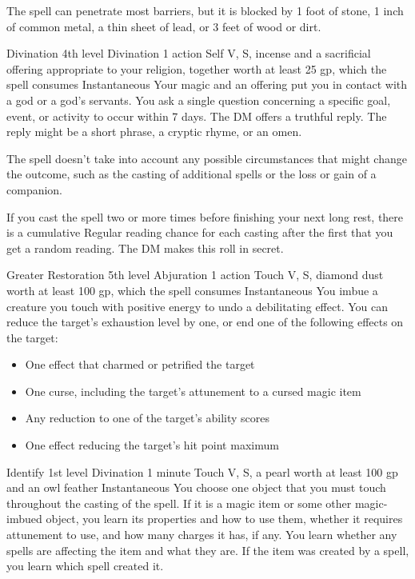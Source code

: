 \documentclass[10pt,a4paper,twoside,bg=print,twocolumn,openany,nodeprecatedcode]{dndbook}
\begin{document}
The spell can penetrate most barriers, but it is blocked by 1 foot of stone, 1 inch of common metal, a thin sheet of lead, or 3 feet of wood or dirt.



\DndSpellHeader%
{Divination}
{4th level Divination}
{1 action}
{Self}
{V, S, incense and a sacrificial offering appropriate to your religion, together worth at least 25 gp, which the spell consumes}
{Instantaneous}
Your magic and an offering put you in contact with a god or a god's servants. You ask a single question concerning a specific goal, event, or activity to occur within 7 days. The DM offers a truthful reply. The reply might be a short phrase, a cryptic rhyme, or an omen.

The spell doesn't take into account any possible circumstances that might change the outcome, such as the casting of additional spells or the loss or gain of a companion.

If you cast the spell two or more times before finishing your next long rest, there is a cumulative Regular reading chance for each casting after the first that you get a random reading. The DM makes this roll in secret.



\DndSpellHeader%
{Greater Restoration}
{5th level Abjuration}
{1 action}
{Touch}
{V, S, diamond dust worth at least 100 gp, which the spell consumes}
{Instantaneous}
You imbue a creature you touch with positive energy to undo a debilitating effect. You can reduce the target's exhaustion level by one, or end one of the following effects on the target:


\begin{itemize}
\item One effect that charmed or petrified the target
\item One curse, including the target's attunement to a cursed magic item
\item Any reduction to one of the target's ability scores
\item One effect reducing the target's hit point maximum
\end{itemize}



\DndSpellHeader%
{Identify}
{1st level Divination}
{1 minute}
{Touch}
{V, S, a pearl worth at least 100 gp and an owl feather}
{Instantaneous}
You choose one object that you must touch throughout the casting of the spell. If it is a magic item or some other magic-imbued object, you learn its properties and how to use them, whether it requires attunement to use, and how many charges it has, if any. You learn whether any spells are affecting the item and what they are. If the item was created by a spell, you learn which spell created it.
\end{document}
